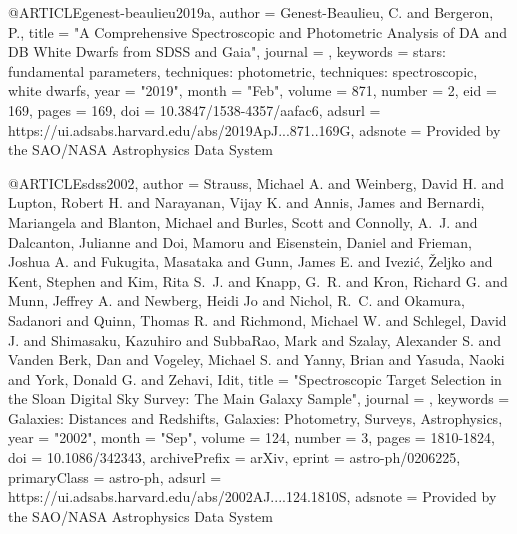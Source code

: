 \documentclass[a4paper,fleqn,usenatbib]{mnras}
\begin{document}
@ARTICLE{genest-beaulieu2019a,
       author = {{Genest-Beaulieu}, C. and {Bergeron}, P.},
        title = "{A Comprehensive Spectroscopic and Photometric Analysis of DA and DB White Dwarfs from SDSS and Gaia}",
      journal = {\apj},
     keywords = {stars: fundamental parameters, techniques: photometric, techniques: spectroscopic, white dwarfs},
         year = "2019",
        month = "Feb",
       volume = {871},
       number = {2},
          eid = {169},
        pages = {169},
          doi = {10.3847/1538-4357/aafac6},
       adsurl = {https://ui.adsabs.harvard.edu/abs/2019ApJ...871..169G},
      adsnote = {Provided by the SAO/NASA Astrophysics Data System}
}


@ARTICLE{sdss2002,
       author = {{Strauss}, Michael A. and {Weinberg}, David H. and {Lupton}, Robert H. and
         {Narayanan}, Vijay K. and {Annis}, James and {Bernardi}, Mariangela and
         {Blanton}, Michael and {Burles}, Scott and {Connolly}, A.~J. and
         {Dalcanton}, Julianne and {Doi}, Mamoru and {Eisenstein}, Daniel and
         {Frieman}, Joshua A. and {Fukugita}, Masataka and {Gunn}, James E. and
         {Ivezi{\'c}}, {\v{Z}}eljko and {Kent}, Stephen and {Kim}, Rita S.~J. and
         {Knapp}, G.~R. and {Kron}, Richard G. and {Munn}, Jeffrey A. and
         {Newberg}, Heidi Jo and {Nichol}, R.~C. and {Okamura}, Sadanori and
         {Quinn}, Thomas R. and {Richmond}, Michael W. and {Schlegel}, David J. and
         {Shimasaku}, Kazuhiro and {SubbaRao}, Mark and {Szalay}, Alexander S. and
         {Vanden Berk}, Dan and {Vogeley}, Michael S. and {Yanny}, Brian and
         {Yasuda}, Naoki and {York}, Donald G. and {Zehavi}, Idit},
        title = "{Spectroscopic Target Selection in the Sloan Digital Sky Survey: The Main Galaxy Sample}",
      journal = {\aj},
     keywords = {Galaxies: Distances and Redshifts, Galaxies: Photometry, Surveys, Astrophysics},
         year = "2002",
        month = "Sep",
       volume = {124},
       number = {3},
        pages = {1810-1824},
          doi = {10.1086/342343},
archivePrefix = {arXiv},
       eprint = {astro-ph/0206225},
 primaryClass = {astro-ph},
       adsurl = {https://ui.adsabs.harvard.edu/abs/2002AJ....124.1810S},
      adsnote = {Provided by the SAO/NASA Astrophysics Data System}
}
\end{document}
